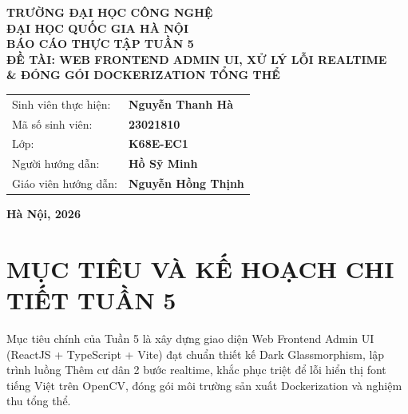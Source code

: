 \documentclass[12pt,a4paper]{article}
\begin{document}
\begin{titlepage}

\begin{center}
    \textbf{\fontsize{14}{17}\selectfont TRƯỜNG ĐẠI HỌC CÔNG NGHỆ} \\
    \textbf{\fontsize{12}{15}\selectfont ĐẠI HỌC QUỐC GIA HÀ NỘI} \\
    
    \vspace{2.5cm}
    \textbf{\fontsize{18}{22}\selectfont BÁO CÁO THỰC TẬP TUẦN 5} \\[0.5cm]
    \textbf{\fontsize{13}{16}\selectfont ĐỀ TÀI: WEB FRONTEND ADMIN UI, XỬ LÝ LỖI REALTIME} \\
    \textbf{\fontsize{13}{16}\selectfont \& ĐÓNG GÓI DOCKERIZATION TỔNG THỂ} \\
    
    \vspace{3.5cm}
    \fontsize{12}{15}\selectfont
    \begin{tabular}{ll}
        Sinh viên thực hiện: & \textbf{Nguyễn Thanh Hà} \\
        Mã số sinh viên: & \textbf{23021810} \\
        Lớp: & \textbf{K68E-EC1} \\
        Người hướng dẫn: & \textbf{Hồ Sỹ Minh} \\
        Giáo viên hướng dẫn: & \textbf{Nguyễn Hồng Thịnh} \\
    \end{tabular}
    
    \vfill
    \textbf{Hà Nội, 2026}
\end{center}
\end{titlepage}

\newpage
\tableofcontents
\newpage

\section{MỤC TIÊU VÀ KẾ HOẠCH CHI TIẾT TUẦN 5}
Mục tiêu chính của Tuần 5 là xây dựng giao diện Web Frontend Admin UI (ReactJS + TypeScript + Vite) đạt chuẩn thiết kế Dark Glassmorphism, lập trình luồng Thêm cư dân 2 bước realtime, khắc phục triệt để lỗi hiển thị font tiếng Việt trên OpenCV, đóng gói môi trường sản xuất Dockerization và nghiệm thu tổng thể.
\end{document}
